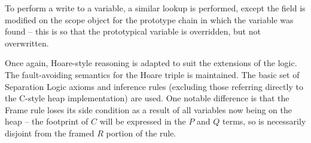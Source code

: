 \documentclass[a4paper]{report}
\begin{document}
  To perform a write to a variable, a similar lookup is performed, except the
  field is modified on the scope object for the prototype chain in which the
  variable was found -- this is so that the prototypical variable is overridden,
  but not overwritten.

  Once again, Hoare-style reasoning is adapted to suit the extensions of the
  logic. The fault-avoiding semantics for the Hoare triple is maintained. The
  basic set of Separation Logic axioms and inference rules (excluding those
  referring directly to the C-style heap implementation) are used. One notable
  difference is that the Frame rule loses its side condition as a result of all
  variables now being on the heap -- the footprint of $C$ will be expressed in
  the $P$ and $Q$ terms, so is necessarily disjoint from the framed $R$ portion of
  the rule.



\end{document}
